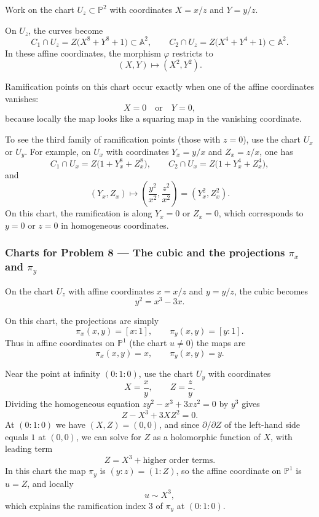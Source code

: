 \documentclass[12pt,a4paper]{article}
\theoremstyle{plain}
\theoremstyle{definition}      %
\begin{document}
Work on the chart \(U_z\subset \mathbb P^2\) with coordinates \(X=x/z\) and \(Y=y/z\).

On \(U_z\), the curves become
\[
C_1\cap U_z
=
Z\bigl(X^8+Y^8+1\bigr)\subset \mathbb A^2,
\qquad
C_2\cap U_z
=
Z\bigl(X^4+Y^4+1\bigr)\subset \mathbb A^2.
\]
In these affine coordinates, the morphism \(\varphi\) restricts to
\[
(X,Y)\longmapsto (X^2,Y^2).
\]

Ramification points on this chart occur exactly when one of the affine coordinates vanishes:
\[
X=0
\quad\text{or}\quad
Y=0,
\]
because locally the map looks like a squaring map in the vanishing coordinate.

To see the third family of ramification points (those with \(z=0\)), use the chart \(U_x\) or \(U_y\).
For example, on \(U_x\) with coordinates \(Y_x=y/x\) and \(Z_x=z/x\), one has
\[
C_1\cap U_x
=
Z\bigl(1+Y_x^8+Z_x^8\bigr),
\qquad
C_2\cap U_x
=
Z\bigl(1+Y_x^4+Z_x^4\bigr),
\]
and
\[
(Y_x,Z_x)\longmapsto \left(\frac{y^2}{x^2},\frac{z^2}{x^2}\right)=(Y_x^2,Z_x^2).
\]
On this chart, the ramification is along \(Y_x=0\) or \(Z_x=0\), which corresponds to \(y=0\) or \(z=0\) in homogeneous coordinates.


\subsubsection*{Charts for Problem 8 — The cubic and the projections \(\pi_x\) and \(\pi_y\)}

On the chart \(U_z\) with affine coordinates \(x=x/z\) and \(y=y/z\), the cubic becomes
\[
y^2=x^3-3x.
\]

On this chart, the projections are simply
\[
\pi_x(x,y)=[x:1],
\qquad
\pi_y(x,y)=[y:1].
\]
Thus in affine coordinates on \(\mathbb P^1\) (the chart \(u\neq 0\)) the maps are
\[
\pi_x(x,y)=x,
\qquad
\pi_y(x,y)=y.
\]

Near the point at infinity \((0:1:0)\), use the chart \(U_y\) with coordinates
\[
X=\frac{x}{y},
\qquad
Z=\frac{z}{y}.
\]
Dividing the homogeneous equation \(zy^2-x^3+3xz^2=0\) by \(y^3\) gives
\[
Z-X^3+3XZ^2=0.
\]
At \((0:1:0)\) we have \((X,Z)=(0,0)\), and since \(\partial/\partial Z\) of the left-hand side equals \(1\) at \((0,0)\), we can solve for \(Z\) as a holomorphic function of \(X\), with leading term
\[
Z=X^3+\text{higher order terms}.
\]
In this chart the map \(\pi_y\) is \((y:z)=(1:Z)\), so the affine coordinate on \(\mathbb P^1\) is \(u=Z\), and locally
\[
u\sim X^3,
\]
which explains the ramification index \(3\) of \(\pi_y\) at \((0:1:0)\).
\end{document}
